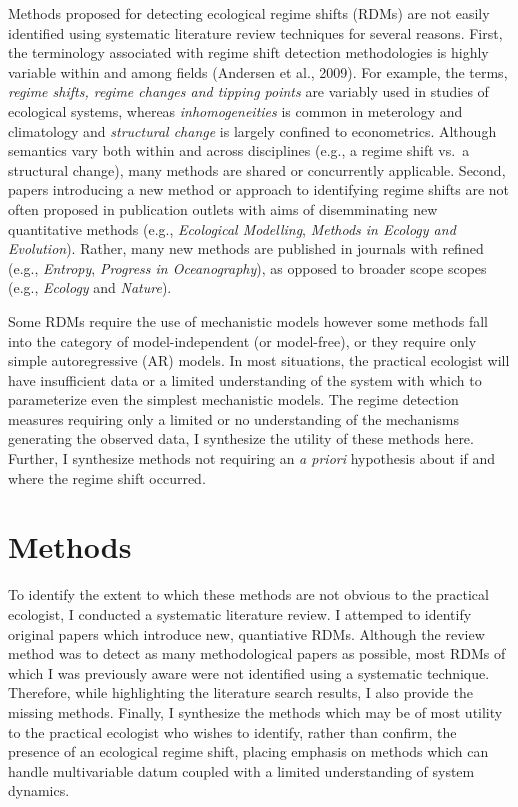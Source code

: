 \documentclass[12pt,twoside,openany]{reedthesis}
\begin{document}
Methods proposed for detecting ecological regime shifts (RDMs) are not easily identified using systematic literature review techniques for several reasons. First, the terminology associated with regime shift detection methodologies is highly variable within and among fields (Andersen et al., 2009). For example, the terms, \emph{regime shifts, regime changes and tipping points} are variably used in studies of ecological systems, whereas \emph{inhomogeneities} is common in meterology and climatology and \emph{structural change} is largely confined to econometrics. Although semantics vary both within and across disciplines (e.g., a regime shift vs.~a structural change), many methods are shared or concurrently applicable. Second, papers introducing a new method or approach to identifying regime shifts are not often proposed in publication outlets with aims of disemminating new quantitative methods (e.g., \emph{Ecological Modelling}, \emph{Methods in Ecology and Evolution}). Rather, many new methods are published in journals with refined (e.g., \emph{Entropy}, \emph{Progress in Oceanography}), as opposed to broader scope scopes (e.g., \emph{Ecology} and \emph{Nature}).

Some RDMs require the use of mechanistic models however some methods fall into the category of model-independent (or model-free), or they require only simple autoregressive (AR) models. In most situations, the practical ecologist will have insufficient data or a limited understanding of the system with which to parameterize even the simplest mechanistic models. The regime detection measures requiring only a limited or no understanding of the mechanisms generating the observed data, I synthesize the utility of these methods here. Further, I synthesize methods not requiring an \emph{a priori} hypothesis about if and where the regime shift occurred.

\hypertarget{methods}{%
\section{Methods}\label{methods}}

To identify the extent to which these methods are not obvious to the practical ecologist, I conducted a systematic literature review. I attemped to identify original papers which introduce new, quantiative RDMs. Although the review method was to detect as many methodological papers as possible, most RDMs of which I was previously aware were not identified using a systematic technique. Therefore, while highlighting the literature search results, I also provide the missing methods. Finally, I synthesize the methods which may be of most utility to the practical ecologist who wishes to identify, rather than confirm, the presence of an ecological regime shift, placing emphasis on methods which can handle multivariable datum coupled with a limited understanding of system dynamics.
\end{document}
